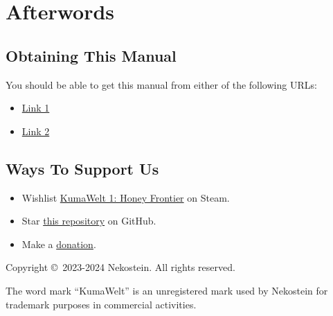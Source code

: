 \documentclass[11pt,a4paper]{report}
\providecommand{\colorhref}[2]{\textcolor{black!20!blue!80!green}{\href{#1}{#2}}}
\begin{document}
\chapter{Afterwords}

\section{Obtaining This Manual}
You should be able to get this manual from either of the following URLs:

\begin{itemize}
	\item \colorhref{https://oss-r2.neruthes.xyz/keep/steam-assets-texkit/SteamAssetsTexKitManual.pdf--802c4c2e158a3a0a00a045783119dd0b.pdf}{Link 1}
	\item \colorhref{https://pub-714f8d634e8f451d9f2fe91a4debfa23.r2.dev/keep/steam-assets-texkit/SteamAssetsTexKitManual.pdf--802c4c2e158a3a0a00a045783119dd0b.pdf}{Link 2}
\end{itemize}


\section{Ways To Support Us}
\begin{itemize}
	\item Wishlist \colorhref{https://nekoste.in/+buyKW1}{KumaWelt 1: Honey Frontier} on Steam.
	\item Star \colorhref{https://github.com/nekostein/steam-assets-texkit}{this repository} on GitHub.
	\item Make a \colorhref{https://nekostein.com/misc/donate}{donation}.
\end{itemize}








\clearpage
\pagestyle{empty}
\leavevmode
\vfill
\small
Copyright \copyright~2023-2024 Nekostein. All rights reserved.

The word mark ``KumaWelt'' is an unregistered mark used by Nekostein
for trademark purposes in commercial activities.
\end{document}
